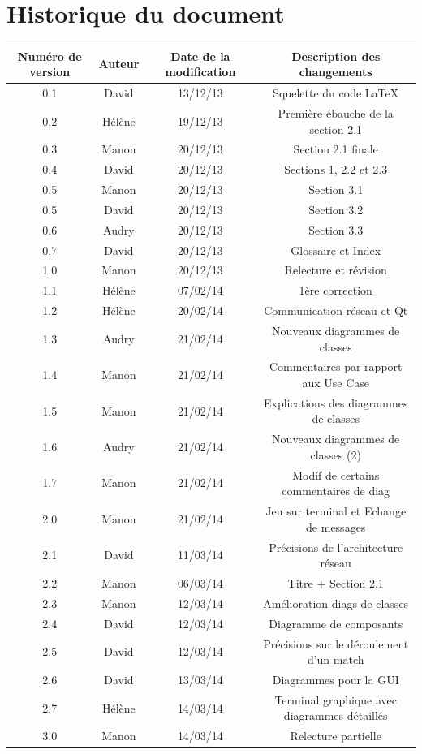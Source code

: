 \documentclass[a4paper,titlepage]{scrreprt}
\begin{document}
\section{Historique du document}
  \begin{tabular}{|c|c|c|c|}
    \hline
    Numéro de version & Auteur & Date de la modification & Description des changements \\
    \hline
    0.1 & David & 13/12/13 & Squelette du code \LaTeX \\
    0.2 & Hélène & 19/12/13 & Première ébauche de la section 2.1 \\
    0.3 & Manon & 20/12/13 & Section 2.1 finale \\
    0.4 & David & 20/12/13 & Sections 1,  2.2 et 2.3 \\
    0.5 & Manon & 20/12/13 & Section 3.1 \\
    0.5 & David & 20/12/13 & Section 3.2 \\
    0.6 & Audry & 20/12/13 & Section 3.3 \\
    0.7 & David & 20/12/13 & Glossaire et Index \\
    1.0 & Manon & 20/12/13 & Relecture et révision \\
    1.1 & Hélène & 07/02/14 & 1ère correction \\
    1.2 & Hélène & 20/02/14 & Communication réseau et Qt \\    
    1.3 & Audry & 21/02/14 & Nouveaux diagrammes de classes \\
    1.4 & Manon & 21/02/14 & Commentaires par rapport aux Use Case \\
    1.5 & Manon & 21/02/14 & Explications des diagrammes de classes \\
    1.6 & Audry & 21/02/14 & Nouveaux diagrammes de classes (2) \\
    1.7 & Manon & 21/02/14 & Modif de certains commentaires de diag \\
    2.0 & Manon & 21/02/14 & Jeu sur terminal et Echange de messages \\
    2.1 & David & 11/03/14 & Précisions de l'architecture réseau \\
    2.2 & Manon & 06/03/14 & Titre + Section 2.1 \\
    2.3 & Manon & 12/03/14 & Amélioration diags de classes \\
    2.4 & David & 12/03/14 & Diagramme de composants \\
    2.5 & David & 12/03/14 & Précisions sur le déroulement d'un match \\
    2.6 & David & 13/03/14 & Diagrammes pour la GUI \\
    2.7 & Hélène & 14/03/14 & Terminal graphique avec diagrammes détaillés\\
    3.0 & Manon & 14/03/14 & Relecture partielle \\
    \hline
  \end{tabular}
\end{document}
